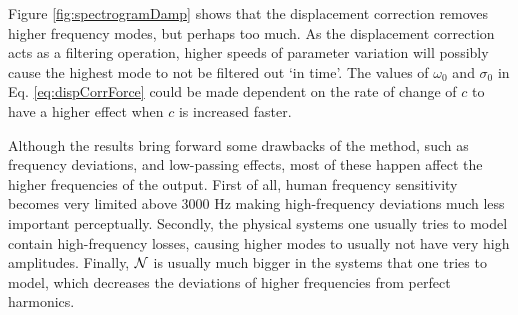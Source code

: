 Figure \ref{fig:spectrogramDamp} shows that the displacement correction removes higher frequency modes, but perhaps too much. As the displacement correction acts as a filtering operation, higher speeds of parameter variation will possibly cause the highest mode to not be filtered out `in time'. The values of $\omega_0$ and $\sigma_0$ in Eq. \eqref{eq:dispCorrForce} could be made dependent on the rate of change of $c$ to have a higher effect when $c$ is increased faster.

Although the results bring forward some drawbacks of the method, such as frequency deviations, and low-passing effects, most of these happen affect the higher frequencies of the output. First of all, human frequency sensitivity becomes very limited above 3000 Hz \cite{Zwicker1990} making high-frequency deviations much less important perceptually. Secondly, the physical systems one usually tries to model contain high-frequency losses, causing higher modes to usually not have very high amplitudes. Finally, $\mathcal{N}$ is usually much bigger in the systems that one tries to model, which decreases the deviations of higher frequencies from perfect harmonics. 

